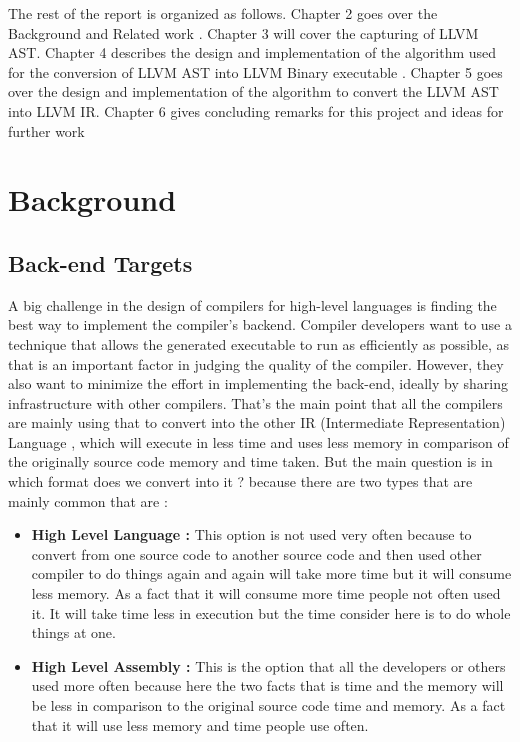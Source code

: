 \documentclass[openany]{book}
\begin{document}
	
	

	
	
The rest of the report is organized as follows. Chapter 2 goes over the Background and Related work . Chapter 3 will cover the capturing of LLVM AST. Chapter 4 describes the design
and implementation of the algorithm used for the conversion of LLVM AST into LLVM Binary executable . Chapter 5 goes over the design and implementation of the algorithm to convert the LLVM AST into LLVM IR. Chapter 6 gives concluding remarks for this project and ideas for further work

\chapter{Background}
\Large
	\section{Back-end Targets}
	A big challenge in the design of compilers for high-level languages is finding the best way to implement the compiler’s backend. Compiler developers want to use a technique that allows the generated executable to run as efficiently as possible, as that is an important factor in judging the quality of the compiler. However, they also want to minimize the effort in implementing the back-end, ideally by sharing infrastructure with other compilers. That’s the main point that all the compilers are mainly using that to convert into the other IR (Intermediate Representation) Language , which will execute in less time and uses less memory in comparison of the originally source code memory and time taken. But the main question is in which format does we convert into it ? because there are two types that are mainly common that are :\newline \newline \begin{itemize}
		\item \textbf{High Level Language :} This option is not used very often because to convert from one source code to another source code and then used other compiler to do things again and again will take more time but it will consume less memory. As a fact that it will consume more time people not often used it. It will take time less in execution but the time consider here is  to do whole things at one.
		\item \textbf{High Level Assembly :} This is the option that all the developers or others used more often because here the two facts that is time and the memory will be less in comparison to the original source code time and memory. As a fact that it will use less memory and time people use often.\newline \newline
	\end{itemize}
\end{document}
